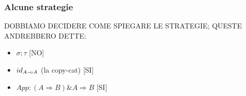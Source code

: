 \documentclass{beamer}
\newcommand{\limp}{\mathbin{{-}\mkern-3.5mu{\circ}}}
\begin{document}
\begin{frame}

	\frametitle{Alcune strategie}
	
	DOBBIAMO DECIDERE COME SPIEGARE LE STRATEGIE; QUESTE ANDREBBERO DETTE:
	\begin{itemize}
		\item $\sigma ; \tau$ [NO]
		\item $id_{A\limp A}$ (la copy-cat) [SI]
		\item $App:(A \Rightarrow B)\& A \Rightarrow B$ [SI]
	\end{itemize}

\end{frame}


\begin{frame}[t]
	
% 	
% 		
% 		
% 		
% 		
% 				
% 				
% 		
% 		
% 		
% 		
	

	
\end{frame}
\end{document}
